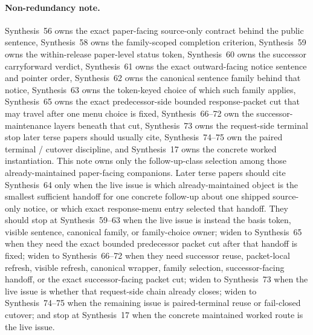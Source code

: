 \documentclass[11pt]{article}
\begin{document}
\paragraph{Non-redundancy note.}
Synthesis~56 owns the exact paper-facing source-only contract behind the public sentence, Synthesis~58 owns the family-scoped completion criterion, Synthesis~59 owns the within-release paper-level status token, Synthesis~60 owns the successor carryforward verdict, Synthesis~61 owns the exact outward-facing notice sentence and pointer order, Synthesis~62 owns the canonical sentence family behind that notice, Synthesis~63 owns the token-keyed choice of which such family applies, Synthesis~65 owns the exact predecessor-side bounded response-packet cut that may travel after one menu choice is fixed, Synthesis~66--72 own the successor-maintenance layers beneath that cut, Synthesis~73 owns the request-side terminal stop later terse papers should usually cite, Synthesis~74--75 own the paired terminal / cutover discipline, and Synthesis~17 owns the concrete worked instantiation.\cite{series:publicrequestcontracts,series:requestfulfillmentcertificates,series:publicrequeststatusenvelopes,series:publicrequestcarryforward,series:publicrequestnotices,series:publicrequestnoticenormalforms,series:publicrequestnoticeselections,series:publicrequestresponsepackets,series:publicrequestresponsepacketcaryforward,series:publicrequestresponsepacketdeltaledgers,series:publicrequestresponsepacketrefreshnotices,series:publicrequestresponsepacketrefreshnoticenormalforms,series:publicrequestresponsepacketrefreshnoticeselections,series:publicrequestresponsepacketrefreshresponsemenus,series:publicrequestresponsepacketrefreshresponsepackets,series:publicrequestresponsepacketrefreshresponsepacketclosureverdicts,series:pairedterminalcitationdiscipline,series:pairedterminalcutoverrules,series:workedexample}
This note owns only the follow-up-class selection among those already-maintained paper-facing companions. Later terse papers should cite Synthesis~64 only when the live issue is which already-maintained object is the smallest sufficient handoff for one concrete follow-up about one shipped source-only notice, or which exact response-menu entry selected that handoff. They should stop at Synthesis~59--63 when the live issue is instead the basis token, visible sentence, canonical family, or family-choice owner; widen to Synthesis~65 when they need the exact bounded predecessor packet cut after that handoff is fixed; widen to Synthesis~66--72 when they need successor reuse, packet-local refresh, visible refresh, canonical wrapper, family selection, successor-facing handoff, or the exact successor-facing packet cut; widen to Synthesis~73 when the live issue is whether that request-side chain already closes; widen to Synthesis~74--75 when the remaining issue is paired-terminal reuse or fail-closed cutover; and stop at Synthesis~17 when the concrete maintained worked route is the live issue.
\end{document}

